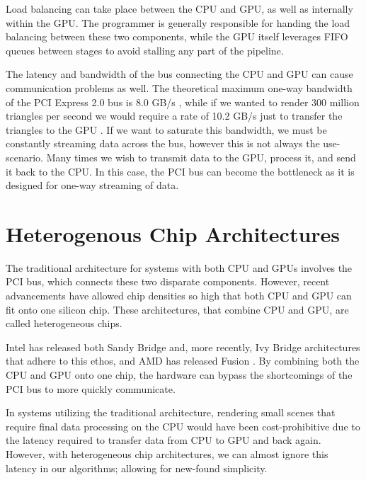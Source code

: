 Load balancing can take place between the CPU and GPU, as well as internally within the GPU. The programmer is generally responsible for handing the load balancing between these two components, while the GPU itself leverages FIFO queues between stages to avoid stalling any part of the pipeline.

The latency and bandwidth of the bus connecting the CPU and GPU can cause communication problems as well. The theoretical maximum one-way bandwidth of the PCI Express 2.0 bus is 8.0 GB/s \cite{bib:pci_press}, while if we wanted to render 300 million triangles per second we would require a rate of 10.2 GB/s just to transfer the triangles to the GPU \cite{bib:rtr}. If we want to saturate this bandwidth, we must be constantly streaming data across the bus, however this is not always the use-scenario. Many times we wish to transmit data to the GPU, process it, and send it back to the CPU. In this case, the PCI bus can become the bottleneck as it is designed for one-way streaming of data.

\section{Heterogenous Chip Architectures}
\label{sec:heterogeneous_chips}

The traditional architecture for systems with both CPU and GPUs involves the PCI bus, which connects these two disparate components. However, recent advancements have allowed chip densities so high that both CPU and GPU can fit onto one silicon chip. These architectures, that combine CPU and GPU, are called heterogeneous chips.

Intel has released both Sandy Bridge and, more recently, Ivy Bridge architectures \cite{bib:intel_press} that adhere to this ethos, and AMD has released Fusion \cite{bib:amd_press}. By combining both the CPU and GPU onto one chip, the hardware can bypass the shortcomings of the PCI bus to more quickly communicate.

In systems utilizing the traditional architecture, rendering small scenes that require final data processing on the CPU would have been cost-prohibitive due to the latency required to transfer data from CPU to GPU and back again. However, with heterogeneous chip architectures, we can almost ignore this latency in our algorithms; allowing for new-found simplicity.

